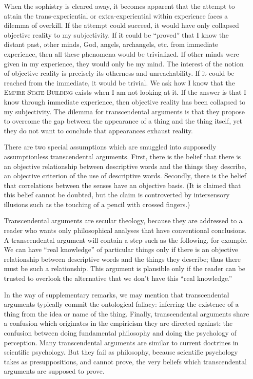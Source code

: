 \begin{enumerate}[label=\textbf{\Alph*.}, wide, nosep, itemsep=1em]
When the sophistry is cleared away, it becomes apparent that the 
attempt to attain the trans-experiential or extra-experiential within 
experience faces a dilemma of overkill. If the attempt could succeed, it 
would have only collapsed objective reality to my subjectivity. If it could be 
\enquote{proved} that I know the distant past, other minds, God, angels, archangels, 
etc. from immediate experience, then all these phenomena would be 
trivialized. If other minds were given in my experience, they would only be 
my mind. The interest of the notion of objective reality is precisely its 
otherness and unreachability. If it could be reached from the immediate, it 
would be trivial. We ask how I know that the \textsc{Empire State Building} exists 
when I am not looking at it. If the answer is that I know through immediate 
experience, then objective reality has been collapsed to my subjectivity. The 
dilemma for transcendental arguments is that they propose to overcome the 
gap between the appearance of a thing and the thing itself, yet they do not 
want to conclude that appearances exhaust reality. 

There are two special assumptions which are smuggled into supposedly 
assumptionless transcendental arguments. First, there is the belief that there 
is an objective relationship between descriptive words and the things they 
describe, an objective criterion of the use of descriptive words. Secondly, 
there is the belief that correlations between the senses have an objective 
basis. (It is claimed that this belief cannot be doubted, but the claim is 
controverted by intersensory illusions such as the touching of a pencil with 
crossed fingers.) 

Transcendental arguments are secular theology, because they are 
addressed to a reader who wants only philosophical analyses that have 
conventional conclusions. A transcendental argument will contain a step 
such as the following, for example. We can have \enquote{real knowledge} of 
particular things only if there is an objective relationship between descriptive 
words and the things they describe; thus there must be such a relationship. 
This argument is plausible only if the reader can be trusted to overlook the 
alternative that we don't have this \enquote{real knowledge.} 

In the way of supplementary remarks, we may mention that 
transcendental arguments typically commit the ontological fallacy: inferring 
the existence of a thing from the idea or name of the thing. Finally, 
transcendental arguments share a confusion which originates in the 
empiricism they are directed against: the confusion between doing 
fundamental philosophy and doing the psychology of perception. Many 
transcendental arguments are similar to current doctrines in scientific 
psychology. But they fail as philosophy, because scientific psychology takes 
as presuppositions, and cannot prove, the very beliefs which transcendental 
arguments are supposed to prove. 

\end{enumerate}